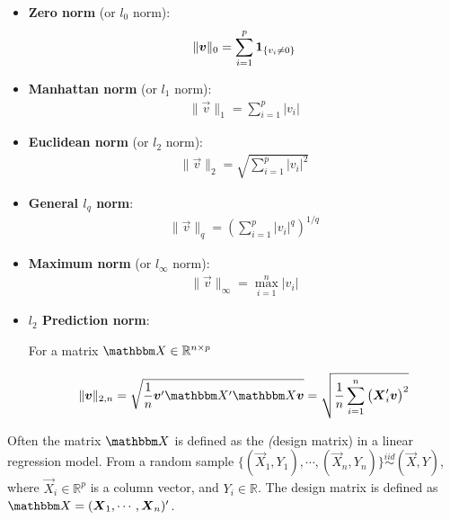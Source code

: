 \begin{itemize}
    \item \textbf{Zero norm} (or \(l_0\) norm):
    \begin{align*}
        \|\boldsymbol{v}\|_0 = \sum_{i=1}^p \boldsymbol{1}_{\{v_i \neq 0\}}
    \end{align*}

    \item \textbf{Manhattan norm} (or \(l_1\) norm):
    \begin{align*}
        \|\Vec{v}\|_1 = \sum_{i=1}^p |v_i|
    \end{align*}

    \item \textbf{Euclidean norm} (or \(l_2\) norm):
    \begin{align*}
        \|\Vec{v}\|_2 = \sqrt{\sum_{i=1}^p |v_i|^2}
    \end{align*}
    
    \item \textbf{General \(l_q\) norm}:
    \begin{align*}
        \|\Vec{v}\|_q = \left(\sum_{i=1}^p |v_i|^q\right)^{1/q}
    \end{align*}

    \item \textbf{Maximum norm} (or \(l_\infty\) norm):
    \begin{align*}
        \|\Vec{v}\|_\infty = \max_{i=1}^n |v_i|
    \end{align*}

    \item \textbf{ \(l_2\) Prediction norm}:
    
    For a matrix $\Mat{X} \in \mathbb{R}^{n \times p}$

    \begin{align*}
        \|\Vec{v}\|_{2, n} = \sqrt{
            \frac{1}{n}
            \Vec{v}'\Mat{X}'\Mat{X}\Vec{v}
        }
        =
        \sqrt{
            \frac{1}{n}
            \sum_{i=1}^n \left(\Vec{X}_i'\Vec{v}\right)^2
        }
    \end{align*}
\end{itemize}

Often the matrix $\Mat{X}$ is defined as the \emph(design matrix) in a linear regression model. From a random sample $\{(\Vec{X}_1, Y_1), \cdots, (\Vec{X}_n, Y_n)\} \overset{iid}{\sim} (\Vec{X}, Y)$, where $\Vec{X}_i \in \mathbb{R}^p$ is a column vector, and $Y_i \in \mathbb{R}$. The design matrix is defined as $\Mat{X} = (\Vec{X}_1, \cdots, \Vec{X}_n)'$.

